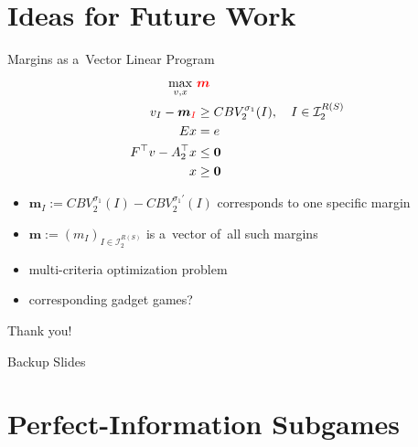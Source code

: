 \documentclass{beamer}
\theoremstyle{definition}
\newcommand{\vect}[1]{\boldsymbol{#1}}
\newcommand{\I}{\mathcal{I}}
\begin{document}
  \section{Ideas for Future Work}

  \begin{frame}{Margins as a~Vector Linear Program}
    \begin{equation*}
      \label{vlp:max-margins}
      \begin{split}
        \max_{v, x}\ &\textcolor{red}{\vect{m}} \\
        v_I - \vect{m}_{\textcolor{red}{I}} &\ge CBV_2^{\sigma_1}(I), \quad I \in \I_2^{R(S)}\\ 
        Ex &= e \\
        F^\top v - A_2^\top x &\le \vect{0} \\
        x &\ge \vect{0}
      \end{split}
    \end{equation*}

    \pause
    \begin{itemize}[<+- | alert@+>]
      \item $\vect{m}_I := CBV_2^{\sigma_1} (I) - CBV_2^{\sigma_1'} (I)$ corresponds to one specific margin
      \item $\vect{m} := (m_I) _{I\in\I_2^{R(S)}}$ is a~vector of~all such margins
      \item multi-criteria optimization problem
      \item corresponding gadget games?
    \end{itemize}
  \end{frame}

  \begin{frame}[standout]
    \begin{center}
      Thank you!
    \end{center}
  \end{frame}


  \appendix

  \begin{frame}[standout]
    Backup Slides
  \end{frame}

  \section{Perfect-Information Subgames}
\end{document}

